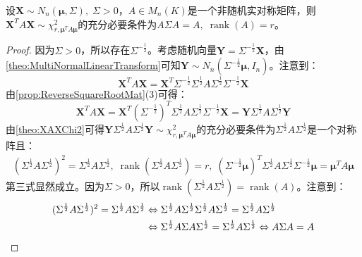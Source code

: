 \begin{corollary}\label{cor:XAXChi2}
	设$\mathbf{X}\sim N_n(\boldsymbol{\mu},\Sigma),\;\Sigma>0$，$A\in M_{n}(K)$是一个非随机实对称矩阵，则$\mathbf{X}^TA\mathbf{X}\sim\chi_{r,\boldsymbol{\mu}^TA\boldsymbol{\mu}}^2$的充分必要条件为$A\Sigma A=A,\;\operatorname{rank}(A)=r$。
\end{corollary}
\begin{proof}
	因为$\Sigma>0$，所以存在$\Sigma^{-\frac{1}{2}}$。考虑随机向量$\mathbf{Y}=\Sigma^{-\frac{1}{2}}\mathbf{X}$，由\cref{theo:MultiNormalLinearTransform}可知$\mathbf{Y}\sim N_n(\Sigma^{-\frac{1}{2}}\boldsymbol{\mu},I_n)$。注意到：
	\begin{equation*}
		\mathbf{X}^TA\mathbf{X}=\mathbf{X}^T\Sigma^{-\frac{1}{2}}\Sigma
		^{\frac{1}{2}}A\Sigma^{\frac{1}{2}}\Sigma^{-\frac{1}{2}}\mathbf{X}
	\end{equation*}
	由\cref{prop:ReverseSquareRootMat}(3)可得：
	\begin{equation*}
		\mathbf{X}^TA\mathbf{X}=\mathbf{X}^T(\Sigma^{-\frac{1}{2}})^T\Sigma
		^{\frac{1}{2}}A\Sigma^{\frac{1}{2}}\Sigma^{-\frac{1}{2}}\mathbf{X}=\mathbf{Y}\Sigma
		^{\frac{1}{2}}A\Sigma^{\frac{1}{2}}\mathbf{Y}
	\end{equation*}
	由\cref{theo:XAXChi2}可得$\mathbf{Y}\Sigma
	^{\frac{1}{2}}A\Sigma^{\frac{1}{2}}\mathbf{Y}\sim\chi_{r,\boldsymbol{\mu}^TA\boldsymbol{\mu}}^2$的充分必要条件为$\Sigma
	^{\frac{1}{2}}A\Sigma^{\frac{1}{2}}$是一个对称阵且：
	\begin{gather*}
		(\Sigma
		^{\frac{1}{2}}A\Sigma^{\frac{1}{2}})^2=\Sigma
		^{\frac{1}{2}}A\Sigma^{\frac{1}{2}},\;
		\operatorname{rank}(\Sigma
		^{\frac{1}{2}}A\Sigma^{\frac{1}{2}})=r,\;
		(\Sigma^{-\frac{1}{2}}\boldsymbol{\mu})^T\Sigma^{\frac{1}{2}} A\Sigma^{\frac{1}{2}}\Sigma^{-\frac{1}{2}}\boldsymbol{\mu}=\boldsymbol{\mu}^TA\boldsymbol{\mu}
	\end{gather*}
	第三式显然成立。因为$\Sigma>0$，所以$\operatorname{rank}(\Sigma
	^{\frac{1}{2}}A\Sigma^{\frac{1}{2}})=\operatorname{rank}(A)$。注意到：
	\begin{align*}
		(\Sigma
		^{\frac{1}{2}}A\Sigma^{\frac{1}{2}})^2=\Sigma
		^{\frac{1}{2}}A\Sigma^{\frac{1}{2}}&\Leftrightarrow
		\Sigma
		^{\frac{1}{2}}A\Sigma^{\frac{1}{2}}\Sigma
		^{\frac{1}{2}}A\Sigma^{\frac{1}{2}}=\Sigma
		^{\frac{1}{2}}A\Sigma^{\frac{1}{2}} \\
		&\Leftrightarrow
		\Sigma^{\frac{1}{2}}A\Sigma A\Sigma^{\frac{1}{2}}=\Sigma
		^{\frac{1}{2}}A\Sigma^{\frac{1}{2}}\Leftrightarrow
		A\Sigma A=A\qedhere
	\end{align*}
\end{proof}

